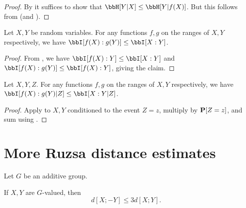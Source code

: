 \begin{proof}\leanok
  By  it suffices to show that $\bbH[Y|X] \leq \bbH[Y|f(X)]$. But this follows from  (and ).
\end{proof}

\begin{lemma}\label{data-process-unc}\leanok Let $X,Y$ be random variables. For any functions $f, g$ on the ranges of $X, Y$ respectively, we have $\bbI[f(X) : g(Y )] \leq \bbI[X : Y]$.
\end{lemma}

\begin{proof}\leanok
   From ,  we have $\bbI[f(X) : Y] \leq \bbI[X:Y]$ and $\bbI[f(X): g(Y)] \leq \bbI[f(X):Y]$, giving the claim.
\end{proof}

\begin{lemma}\label{data-process}\leanok Let $X,Y,Z$. For any functions $f, g$
on the ranges of $X, Y$ respectively, we have $\bbI[f(X) : g(Y )|Z] \leq \bbI[X :Y |Z]$.
\end{lemma}

\begin{proof}\leanok  Apply  to $X,Y$ conditioned to the event $Z=z$, multiply by ${\bf P}[Z=z]$, and sum using .
\end{proof}

\section{More Ruzsa distance estimates}

Let $G$ be an additive group.

\begin{lemma}\label{sign-flip}\leanok
  If $X,Y$ are $G$-valued, then
  $$  d[X ; -Y]  \leq 3 d[X;Y].$$
\end{lemma}

